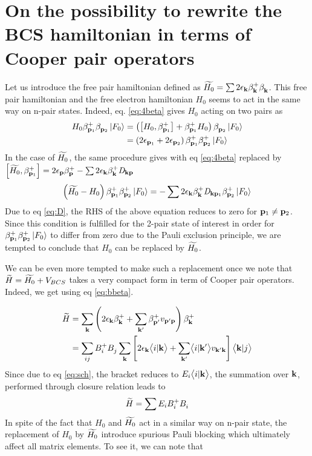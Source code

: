 \section{On the possibility to rewrite the BCS hamiltonian in terms of Cooper pair operators}
Let us introduce the free pair hamiltonian defined as $\widetilde{H_0}=\sum{2\epsilon_{\ensuremath{\mathbf{k}}}\beta^+_{\ensuremath{\mathbf{k}}}\beta^{}_{\ensuremath{\mathbf{k}}}}$.
This free pair hamiltonian and the free electron hamiltonian $H_0$ seems to act in the same way on n-pair states. Indeed, eq. \eqref{eq:4beta} gives $H_0$ acting on two pairs as 
\begin{equation}
\begin{split}
H_0\beta^+_{\mathbf{p}_1}\beta^{}_{\mathbf{p}_2}\left|F_0\right>&=\left(\left[H_0,\beta^+_{\mathbf{p}_1}\right]+{\beta^+_{\mathbf{p}_1}}{H_0}\right)\beta^{}_{\mathbf{p}_2}\left|F_0\right>\\
&=\left(2\epsilon_{\mathbf{p}_1}+2\epsilon_{\mathbf{p}_2}\right)\beta^+_{\mathbf{p}_1}\beta^{+}_{\mathbf{p}_2}\left|F_0\right>
\end{split}
\end{equation}
In the case of $\widetilde{H_0}$, the same procedure gives with eq \eqref{eq:4beta} replaced by $\left[\widetilde{H_0},\beta^+_{\mathbf{p}_1}\right]=2\epsilon_{\mathbf{p}}\beta^+_{\mathbf{p}}-\sum2\epsilon_{\mathbf{k}}\beta^+_{\mathbf{k}}{}\mathit{D}_{\mathbf{k}\mathbf{p}}$
\begin{equation}
\left(\widetilde{H_0}-H_0\right)\beta^+_{\mathbf{p}_1}\beta^{+}_{\mathbf{p}_2}\left|F_0\right>=-\sum2\epsilon_{\mathbf{k}}\beta^+_{\mathbf{k}}{}\mathit{D}_{\mathbf{k}\mathbf{p}_1}\beta^{+}_{\mathbf{p}_2}\left|F_0\right>
\end{equation}
Due to eq \eqref{eq:D}, the RHS of the above equation reduces to zero for $\mathbf{p}_1\neq\mathbf{p}_2$.  Since this condition is fulfilled for the 2-pair state of interest in order for $\beta^+_{\mathbf{p}_1}\beta^{+}_{\mathbf{p}_2}\left|F_0\right>$ to differ from zero  due to the Pauli exclusion principle, we are tempted to conclude that $H_0$ can be replaced by $\widetilde{H_0}$.

We can be even more tempted to make such a replacement once we note that $\widetilde{H}=\widetilde{H_0}+V_{BCS}$ takes a very compact form in term of Cooper pair operators. Indeed, we get using eq \eqref{eq:bbeta}.

\begin{equation}
\begin{split}
\widetilde{H}&=\sum_{\mathbf{k}}\left(2\epsilon_{\mathbf{k}}\beta^+_{\mathbf{k}}+\sum_{\mathbf{k}'}\beta^+_{\mathbf{p}'}v_{\mathbf{p}'\mathbf{p}}\right)\beta^+_{\mathbf{k}}\\	&=\sum_{ij}B^+_iB^{}_j\sum_{\mathbf{k}}\left[2\epsilon_{\mathbf{k}}\bigl<{{i}|{\mathbf{k}}}\bigr>+\sum_{\mathbf{k}'}\bigl<{{i}|{\mathbf{k}'}}\bigr>v_{\mathbf{k}'\mathbf{k}}\right]\bigl<{{\mathbf{k}}|{j}}\bigr>
\end{split}
\end{equation}
Since due to eq \eqref{eq:sch}, the bracket reduces to $E_i\bigl<{{i}|{\mathbf{k}}}\bigr>$, the summation over $\mathbf{k}$, performed through closure relation leads to 
\begin{equation}
\widetilde{H}=\sum{}E_iB^+_iB^{}_i
\end{equation}
In spite of the fact that $H_0$ and $\widetilde{H_0}$ act in a similar way on n-pair state, the replacement of $H_0$ by $\widetilde{H_0}$ introduce spurious Pauli blocking which ultimately affect all matrix elements.  To see it, we can note that

